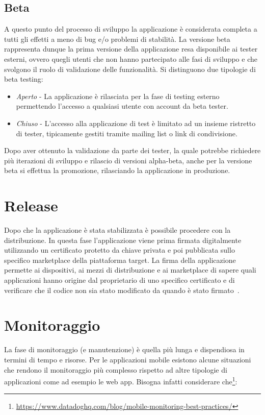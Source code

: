 \subsection{Beta}
A questo punto del processo di sviluppo la applicazione è considerata completa a tutti gli effetti a meno di bug e/o problemi di stabilità. La versione beta rappresenta dunque la prima versione della applicazione resa disponibile ai tester esterni, ovvero quegli utenti che non hanno partecipato alle fasi di sviluppo e che svolgono il ruolo di validazione delle funzionalità. Si distinguono due tipologie di beta testing:

\begin{itemize}
    \item \textit{Aperto} - La applicazione è rilasciata per la fase di testing esterno permettendo l'accesso a qualsiasi utente con account da beta tester.
    \item \textit{Chiuso} - L'accesso alla applicazione di test è limitato ad un insieme ristretto di tester, tipicamente gestiti tramite mailing list o link di condivisione.
\end{itemize}

Dopo aver ottenuto la validazione da parte dei tester, la quale potrebbe richiedere più iterazioni di sviluppo e rilascio di versioni alpha-beta, anche per la versione beta si effettua la promozione, rilasciando la applicazione in produzione.

\section{Release}
Dopo che la applicazione è stata stabilizzata è possibile procedere con la distribuzione. In questa fase l'applicazione viene prima firmata digitalmente utilizzando un certificato protetto da chiave privata e poi pubblicata sullo specifico marketplace della piattaforma target. La firma della applicazione permette ai dispositivi, ai mezzi di distribuzione e ai marketplace di sapere quali applicazioni hanno origine dal proprietario di uno specifico certificato e di verificare che il codice non sia stato modificato da quando è stato firmato~\cite{mednieks2011programming}.

\section{Monitoraggio}
La fase di monitoraggio (e manutenzione) è quella più lunga e dispendiosa in termini di tempo e risorse. Per le applicazioni mobile esistono alcune situazioni che rendono il monitoraggio più complesso rispetto ad altre tipologie di applicazioni come ad esempio le web app. Bisogna infatti considerare che\footnote{\href{https://www.datadoghq.com/blog/mobile-monitoring-best-practices/}{https://www.datadoghq.com/blog/mobile-monitoring-best-practices/}}:

